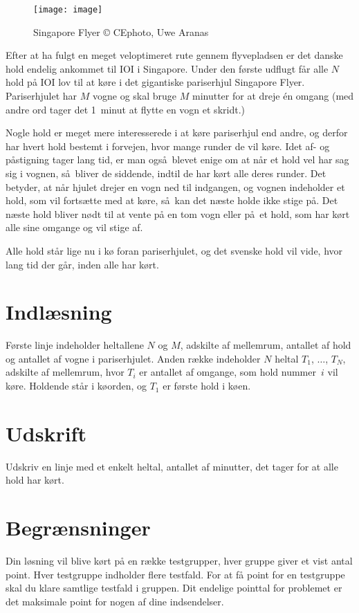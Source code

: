 \begin{wrapfigure}{r}{0.3\textwidth}
	\texttt{[image: image]}
	\caption{\centering Singapore Flyer \newline © CEphoto, Uwe Aranas}
\end{wrapfigure}

Efter at ha fulgt en meget veloptimeret rute gennem flyvepladsen er det danske hold endelig ankommet til IOI i Singapore.
Under den første udflugt får alle $N$ hold på IOI lov til at køre i det gigantiske pariserhjul Singapore Flyer.
Pariserhjulet har $M$ vogne og skal bruge $M$ minutter for at dreje én omgang (med andre ord tager det 1~minut at flytte en vogn et skridt.)

Nogle hold er meget mere interesserede i at køre pariserhjul end andre, og derfor har hvert hold bestemt i forvejen, hvor mange runder de vil køre.
Idet af- og påstigning tager lang tid, er man også blevet enige om at når et hold vel har sag sig i vognen, så bliver de siddende, indtil de har kørt alle deres runder.
Det betyder, at når hjulet drejer en vogn ned til indgangen, og vognen indeholder et hold, som vil fortsætte med at køre, så kan det næste holde ikke stige på.
Det næste hold bliver nødt til at vente på en tom vogn eller på et hold, som har kørt alle sine omgange og vil stige af.


Alle hold står lige nu i kø foran pariserhjulet, og det svenske hold vil vide, hvor lang tid der går, inden alle har kørt.

\section*{Indlæsning}
Første linje indeholder heltallene $N$ og $M$, adskilte af mellemrum, antallet af hold og antallet af vogne i pariserhjulet.
Anden række indeholder $N$ heltal $T_1$, $\ldots$, $T_N$, adskilte af mellemrum, hvor $T_i$ er antallet af omgange, som hold  nummer~$i$ vil køre.
Holdende står i køorden, og $T_1$ er første hold i køen.

\section*{Udskrift}
Udskriv en linje med et enkelt heltal, antallet af minutter, det tager for at alle hold har kørt.

\section*{Begrænsninger}
Din løsning vil blive kørt på en række testgrupper, hver gruppe giver et vist antal point.
Hver testgruppe indholder flere testfald.
For at få point for en testgruppe skal du klare samtlige testfald i gruppen.
Dit endelige pointtal for problemet er det maksimale point for nogen af dine indsendelser.

